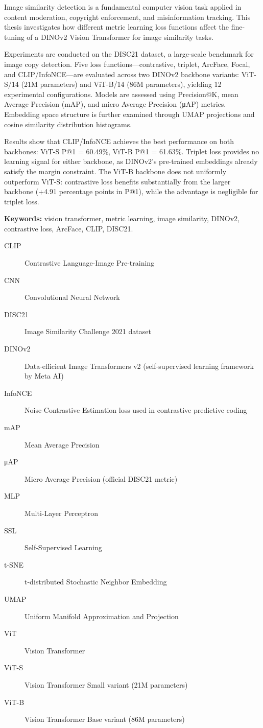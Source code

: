 \documentclass[
    english,
]{VUMIFPSbakalaurinis}
\begin{document}
Image similarity detection is a fundamental computer vision task applied in content moderation, copyright enforcement, and misinformation tracking. This thesis investigates how different metric learning loss functions affect the fine-tuning of a DINOv2 Vision Transformer for image similarity tasks.

Experiments are conducted on the DISC21 dataset, a large-scale benchmark for image copy detection. Five loss functions---contrastive, triplet, ArcFace, Focal, and CLIP/InfoNCE---are evaluated across two DINOv2 backbone variants: ViT-S/14 (21M parameters) and ViT-B/14 (86M parameters), yielding 12 experimental configurations. Models are assessed using Precision@K, mean Average Precision (mAP), and micro Average Precision (μAP) metrics. Embedding space structure is further examined through UMAP projections and cosine similarity distribution histograms.

Results show that CLIP/InfoNCE achieves the best performance on both backbones: ViT-S P@1 = 60.49\%, ViT-B P@1 = 61.63\%. Triplet loss provides no learning signal for either backbone, as DINOv2's pre-trained embeddings already satisfy the margin constraint. The ViT-B backbone does not uniformly outperform ViT-S: contrastive loss benefits substantially from the larger backbone (+4.91 percentage points in P@1), while the advantage is negligible for triplet loss.

\textbf{Keywords:} vision transformer, metric learning, image similarity, DINOv2, contrastive loss, ArcFace, CLIP, DISC21.


\begin{description}
    \item[CLIP] Contrastive Language-Image Pre-training
    \item[CNN] Convolutional Neural Network
    \item[DISC21] Image Similarity Challenge 2021 dataset
    \item[DINOv2] Data-efficient Image Transformers v2 (self-supervised learning framework by Meta AI)
    \item[InfoNCE] Noise-Contrastive Estimation loss used in contrastive predictive coding
    \item[mAP] Mean Average Precision
    \item[μAP] Micro Average Precision (official DISC21 metric)
    \item[MLP] Multi-Layer Perceptron
    \item[SSL] Self-Supervised Learning
    \item[t-SNE] t-distributed Stochastic Neighbor Embedding
    \item[UMAP] Uniform Manifold Approximation and Projection
    \item[ViT] Vision Transformer
    \item[ViT-S] Vision Transformer Small variant (21M parameters)
    \item[ViT-B] Vision Transformer Base variant (86M parameters)
\end{description}
\end{document}
